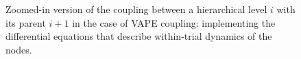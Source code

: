 \begin{figure}
  \centering

  \small

  \newcommand{\w}[1]{\textcolor{white}{#1}}
  \def\svgwidth{0.9\textwidth}


  \caption{Zoomed-in version of the coupling between a hierarchical level $i$ with its parent $i+1$ in the case of \textsf{VAPE} coupling: implementing the differential equations that describe within-trial dynamics of the nodes.}
  \label{\figlabel}
\end{figure}
